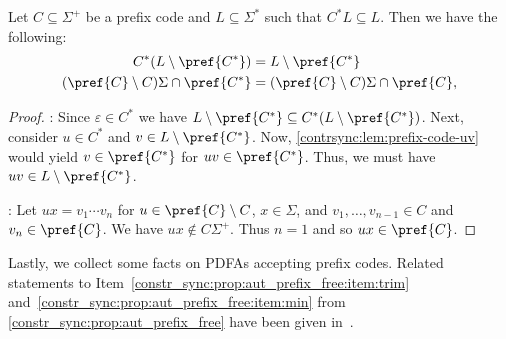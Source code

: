 \begin{corollary}
	Let $C \subseteq \Sigma^+$ be a prefix code and $L \subseteq \Sigma^*$
	such that $C^* L \subseteq L$.
	Then we have the following:
	\begin{align}  
		C^* ( L \setminus \pref{C^*} ) & = L \setminus \pref{C^*} \label{constrsync:eqn:complementprefCstar} \\	
		( \pref{C} \setminus C ) \Sigma	\cap \pref{C^*} & = ( \pref{C} \setminus C ) \Sigma	\cap \pref{C}, \label{constrsync:eqn:capprefCstar} 
	\end{align}
\end{corollary}
\begin{proof}
	: Since $\varepsilon \in C^*$
	we have $L \setminus \pref{C^*} \subseteq 	C^* ( L \setminus \pref{C^*} )$.
	Next, consider $u \in C^*$
	and $v \in L \setminus \pref{C^*}$.
	Now, \cref{contrsync:lem:prefix-code-uv} 
	would yield $v \in \pref{C^*}$
	for $uv \in \pref{C^*}$.
	Thus, we must have $uv \in  L \setminus \pref{C^*}$.
	
	:	
	Let $ux = v_1 \cdots v_n$ for $u \in \pref{C} \setminus C$, $x \in \Sigma$,
	and $v_1, \ldots, v_{n-1} \in C$
	and $v_n \in \pref{C}$.
	We have $ux \notin C\Sigma^+$.
	Thus $n = 1$ and so $ux \in \pref{C}$.
\end{proof}

Lastly, we collect some facts on PDFAs accepting prefix codes. Related statements to Item~\ref{constr_sync:prop:aut_prefix_free:item:trim} and~\ref{constr_sync:prop:aut_prefix_free:item:min}
from \ref{constr_sync:prop:aut_prefix_free} have been given in~\cite[Prop.~2.2]{Eilenberg1974}.


